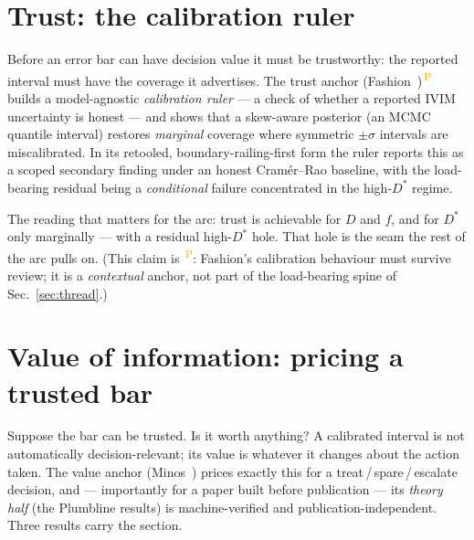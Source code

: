 \documentclass[11pt]{article}
\newcommand{\Dstar}{D^{*}}
\newcommand{\PROV}{\textsuperscript{\textcolor{orange}{\,P}}}
\begin{document}
\section{Trust: the calibration ruler}\label{sec:trust}
Before an error bar can have decision value it must be trustworthy: the reported interval must
have the coverage it advertises. The trust anchor (Fashion~\citep{fashion})\PROV{} builds a
model-agnostic \emph{calibration ruler} --- a check of whether a reported IVIM uncertainty is
honest --- and shows that a skew-aware posterior (an MCMC quantile interval) restores
\emph{marginal} coverage where symmetric $\pm\sigma$ intervals are miscalibrated. In its
retooled, boundary-railing-first form the ruler reports this as a scoped secondary finding under
an honest Cram\'er--Rao baseline, with the load-bearing residual being a \emph{conditional}
failure concentrated in the high-$\Dstar$ regime.

The reading that matters for the arc: trust is achievable for $D$ and $f$, and for $\Dstar$ only
marginally --- with a residual high-$\Dstar$ hole. That hole is the seam the rest of the arc
pulls on. (This claim is \PROV: Fashion's calibration behaviour must survive review; it is a
\emph{contextual} anchor, not part of the load-bearing spine of Sec.~\ref{sec:thread}.)

\section{Value of information: pricing a trusted bar}\label{sec:voi}
Suppose the bar can be trusted. Is it worth anything? A calibrated interval is not automatically
decision-relevant; its value is whatever it changes about the action taken. The value anchor
(Minos~\citep{minos}) prices exactly this for a treat\,/\,spare\,/\,escalate decision, and ---
importantly for a paper built before publication --- its \emph{theory half} (the Plumbline
results) is machine-verified and publication-independent. Three results carry the section.
\end{document}
